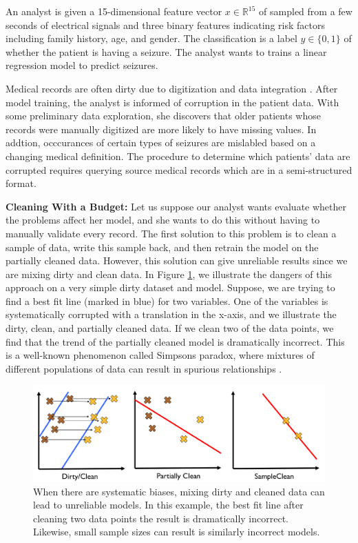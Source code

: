 \begin{example}
An analyst is given a 15-dimensional feature vector $x \in \mathbb{R}^{15}$ of sampled from a few seconds of electrical signals and three binary features indicating risk factors including family history, age, and gender.
The classification is a label $y\in \{0,1\}$ of whether the patient is having a seizure.
The analyst wants to trains a linear regression model to predict seizures.

Medical records are often dirty due to digitization and data integration \cite{fortunearticle}.
After model training, the analyst is informed of corruption in the patient data.
With some preliminary data exploration, she discovers that older patients whose records were manually digitized are more likely to have missing values.
In addtion, occcurances of certain types of seizures are mislabled based on a changing medical definition.
The procedure to determine which patients' data are corrupted requires querying source medical records which are in a semi-structured format.
\end{example}

\noindent\textbf{Cleaning With a Budget: }  Let us suppose our analyst wants evaluate whether the problems affect her model, and she wants to do this without having to manually validate every record. The first solution to this problem is to clean a sample of data, write this sample back, and then retrain the model on the partially cleaned data.
However, this solution can give unreliable results since we are mixing dirty and clean data.
In Figure \ref{update-arch1}, we illustrate the dangers of this approach on a very simple dirty dataset and model.
Suppose, we are trying to find a best fit line (marked in blue) for two variables. 
One of the variables is systematically corrupted with a translation in the x-axis, and we illustrate the dirty, clean, and partially cleaned data.
If we clean two of the data points, we find that the trend of the partially cleaned model is dramatically incorrect.
This is a well-known phenomenon called Simpsons paradox, where mixtures of different populations of data can result in spurious relationships \cite{simpson1951interpretation}.

\begin{figure}[ht!]
\centering
 \includegraphics[width=\columnwidth]{figs/update-arch.png}
 \caption{When there are systematic biases, mixing dirty and cleaned data can lead to unreliable models. In this example, the best fit line after cleaning two data points the result is dramatically incorrect. Likewise, small sample sizes can result is similarly incorrect models. \label{update-arch1}}
\end{figure}

